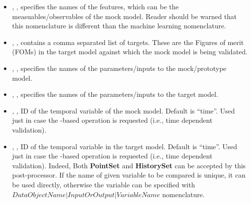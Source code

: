 %
%

\begin{itemize}
  \item {}, , specifies the names of  the features, which can be the measuables/observables of the mock model. Reader should be warned that this nomenclature is different than the machine learning nomenclature.

  \item {}, , contains a comma separated list of
     targets. These are the Figures of merit (FOMs) in the target model against which the mock model is being validated.

    \item {}, , specifies the names of  the parameters/inputs to the mock/prototype model.

    \item {}, , specifies the names of the parameters/inputs to the target model.

        \item {},  , ID of the temporal variable of the mock model. Default is ``time''.
        \nb Used just in case the  -based operation  is requested (i.e., time dependent validation).
        \item {}, , ID of the temporal variable in the target model. Default is ``time''.
        \nb Used just in case the  -based operation  is requested (i.e., time dependent validation).
Indeed, Both \textbf{PointSet} and \textbf{HistorySet} can be accepted by this post-processor.
If the name of given variable to be compared is unique, it can be used directly, otherwise the variable can be specified
with $DataObjectName|InputOrOutput|VariableName$ nomenclature.


\end{itemize}
